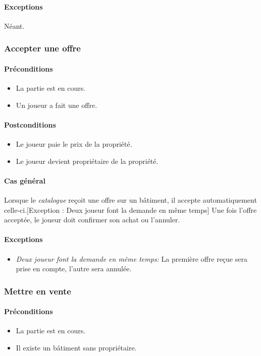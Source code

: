 \documentclass[a4paper,11pt]{report}
\begin{document}
\paragraph{Exceptions} Néant.

\subsubsection{Accepter une offre}
\paragraph{Préconditions}
\begin{itemize}
 \item La partie est en cours.
 \item Un joueur a fait une offre.
\end{itemize}
\paragraph{Postconditions}
\begin{itemize}
 \item Le joueur paie le prix de la propriété.
 \item Le joueur devient propriétaire de la propriété.
\end{itemize}
\paragraph{Cas général}
Lorsque le \textit{catalogue} reçoit une offre sur un bâtiment, il accepte automatiquement celle-ci.[Exception : Deux joueur font la demande en même temps] Une fois l'offre acceptée, le joueur doit confirmer son achat ou l'annuler.
\paragraph{Exceptions}
\begin{itemize}
 \item \textit{Deux joueur font la demande en même temps:} La première offre reçue sera prise en compte, l'autre sera annulée.
\end{itemize}

\subsubsection{Mettre en vente}
\paragraph{Préconditions}
\begin{itemize}
 \item La partie est en cours.
 \item Il existe un bâtiment sans propriétaire.
\end{itemize}
\end{document}
